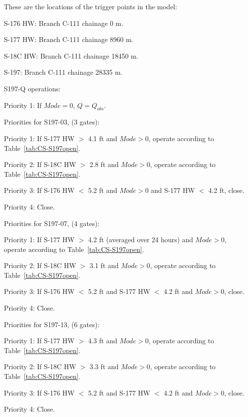 These are the locations of the trigger points in the model:
\begin{packed_items}
\item S-176 HW: Branch C-111 chainage 0 m.
\item S-177 HW: Branch C-111 chainage 8960 m.
\item S-18C HW: Branch C-111 chainage 18450 m.
\item S-197: Branch C-111 chainage 28335 m.
\end{packed_items}


S197-Q operations:
\begin{packed_items}
\item Priority 1: If $Mode=0$, $Q = Q_{obs}$.
\end{packed_items}

Priorities for S197-03, (3 gates):
\begin{packed_items}
\item Priority 1: If S-177 HW $>$ 4.1 ft and $Mode>0$, operate according to Table~\ref{tab:CS-S197open}.
\item Priority 2: If S-18C HW $>$ 2.8 ft and $Mode>0$, operate according to Table~\ref{tab:CS-S197open}.
\item Priority 3: If S-176 HW $<$ 5.2 ft and $Mode>0$ and S-177 HW $<$ 4.2 ft, close.
\item Priority 4: Close.
\end{packed_items}


Priorities for S197-07, (4 gates):
\begin{packed_items}
\item Priority 1: If S-177 HW $>$ 4.2 ft (averaged over 24 hours) and $Mode>0$, operate according to Table~\ref{tab:CS-S197open}.
\item Priority 2: If S-18C HW $>$ 3.1 ft and $Mode>0$, operate according to Table~\ref{tab:CS-S197open}.
\item Priority 3: If S-176 HW $<$ 5.2 ft and S-177 HW $<$ 4.2 ft and $Mode>0$, close.
\item Priority 4: Close.
\end{packed_items}


Priorities for S197-13, (6 gates):
\begin{packed_items}
\item Priority 1: If S-177 HW $>$ 4.3 ft and $Mode>0$, operate according to Table~\ref{tab:CS-S197open}.
\item Priority 2: If S-18C HW $>$ 3.3 ft and $Mode>0$, operate according to Table~\ref{tab:CS-S197open}.
\item Priority 3: If S-176 HW $<$ 5.2 ft and S-177 HW $<$ 4.2 ft and $Mode>0$, close.
\item Priority 4: Close.
\end{packed_items}


